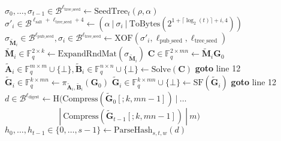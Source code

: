 \begin{algorithm}[H]
\begin{algorithmic}[1]
\State $\sigma_0, \ldots, \sigma_{t-1} \in \mathcal{B}^{\ell_\text{tree\_seed}} \gets \text{SeedTree}_t(\rho, \alpha)$
    \State $\sigma'_i \in \mathcal{B}^{\ell_\text{salt} + \ell_\text{tree\_seed} + 4} \gets (\alpha~|~\sigma_i~|~\text{ToBytes}(2^{1 + \lceil \log_2(t) \rceil + i, 4}))$
    \State $\sigma_{\tilde{\textbf{M}}_i} \in \mathcal{B}^{\ell_\text{pub\_seed}}, \sigma_i \in \mathcal{B}^{\ell_\text{tree\_seed}} \gets \text{XOF}(\sigma'_i, \ell_\text{pub\_seed}, \ell_\text{tree\_seed})$
    \State $\tilde{\textbf{M}}_i \in \mathds{F}_q^{2 \times k} \gets \text{ExpandRndMat}(\sigma_{\tilde{\textbf{M}}_i})$
    \State $\textbf{C} \in \mathds{F}_q^{2 \times mn} \gets \tilde{\textbf{M}}_i \textbf{G}_0$
    \State $\widetilde{\textbf{A}}_i \in \mathds{F}_q^{m \times m} \cup \{\bot\}, \widetilde{\textbf{B}}_i \in \mathds{F}_q^{n \times n} \cup \{\bot\} \gets \text{Solve}(\textbf{C})$
        \State \textbf{goto} line 12 %
    \EndIf
    \State $\tilde{\textbf{G}}_i \in \mathds{F}_q^{k \times mn} \gets \pi_{\widetilde{\textbf{A}}_i, \widetilde{\textbf{B}}_i}(\textbf{G}_0)$
    \State $\tilde{\textbf{G}}_i \in \mathds{F}_q^{k \times mn} \cup \{\bot\} \gets \text{SF}(\tilde{\textbf{G}}_i)$
        \State \textbf{goto} line 12 %
    \EndIf
\EndFor
\State $d \in \mathcal{B}^{\ell_\text{digest}} \gets \text{H}(\text{Compress}(\tilde{\textbf{G}}_0[;k,mn-1])~|~\ldots$\\
$\quad\quad\quad\quad\quad\quad~~|~\text{Compress}(\tilde{\textbf{G}}_{t-1}[;k,mn-1])~|~m)$
\State $h_0, \ldots, h_{t-1} \in \{0, \ldots, s-1\} \gets \text{ParseHash}_{s,t,w}(d)$

\end{algorithmic}
\end{algorithm}
